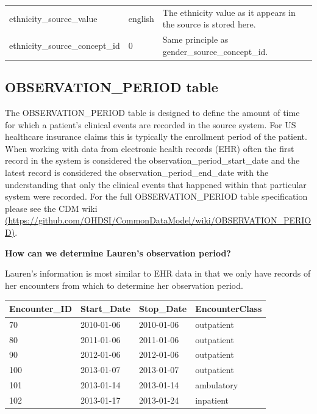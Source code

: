 \documentclass[]{book}
\begin{document}
\begin{longtable}[]{@{}lll@{}}
\begin{minipage}[t]{0.33\columnwidth}
ethnicity\_source\_value\strut
\end{minipage} & \begin{minipage}[t]{0.15\columnwidth}\raggedright
english\strut
\end{minipage} & \begin{minipage}[t]{0.43\columnwidth}\raggedright
The ethnicity value as it appears in the source is stored here.\strut
\end{minipage}\tabularnewline
\begin{minipage}[t]{0.33\columnwidth}\raggedright
ethnicity\_source\_concept\_id\strut
\end{minipage} & \begin{minipage}[t]{0.15\columnwidth}\raggedright
0\strut
\end{minipage} & \begin{minipage}[t]{0.43\columnwidth}\raggedright
Same principle as gender\_source\_concept\_id.\strut
\end{minipage}\tabularnewline
\bottomrule
\end{longtable}

\hypertarget{observationPeriod}{%
\subsection{OBSERVATION\_PERIOD table}\label{observationPeriod}}

The OBSERVATION\_PERIOD table is designed to define the amount of time for which a patient's clinical events are recorded in the source system. For US healthcare insurance claims this is typically the enrollment period of the patient. When working with data from electronic health records (EHR) often the first record in the system is considered the observation\_period\_start\_date and the latest record is considered the observation\_period\_end\_date with the understanding that only the clinical events that happened within that particular system were recorded. For the full OBSERVATION\_PERIOD table specification please see the CDM wiki \href{https://github.com/OHDSI/CommonDataModel/wiki/OBSERVATION_PERIOD}{(https://github.com/OHDSI/CommonDataModel/wiki/OBSERVATION\_PERIOD)}.

\textbf{How can we determine Lauren's observation period?}

Lauren's information is most similar to EHR data in that we only have records of her encounters from which to determine her observation period.

\begin{longtable}[]{@{}llll@{}}
\toprule
Encounter\_ID & Start\_Date & Stop\_Date & EncounterClass\tabularnewline
\midrule
\endhead
70 & 2010-01-06 & 2010-01-06 & outpatient\tabularnewline
80 & 2011-01-06 & 2011-01-06 & outpatient\tabularnewline
90 & 2012-01-06 & 2012-01-06 & outpatient\tabularnewline
100 & 2013-01-07 & 2013-01-07 & outpatient\tabularnewline
101 & 2013-01-14 & 2013-01-14 & ambulatory\tabularnewline
102 & 2013-01-17 & 2013-01-24 & inpatient\tabularnewline
\bottomrule
\end{longtable}
\end{document}

